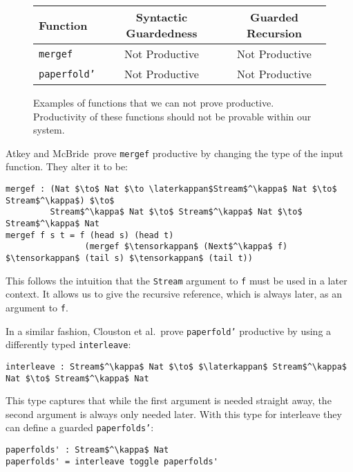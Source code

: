 \begin{figure}[h]
\begin{center}
  \begin{tabular}{| l | c | c |} \hline
    Function & Syntactic Guardedness & Guarded Recursion \\ \hline
    \texttt{mergef} & Not Productive & Not Productive \\ \hline
    \texttt{paperfold'} & Not Productive & Not Productive \\ \hline
  \end{tabular}
\end{center}
  \caption{Examples of functions that we can not prove productive. Productivity
    of these functions should not be provable within our system.}
  \label{fig:productivity_table_3}
\end{figure}

Atkey and McBride\,\citep{Atkey:2013} prove \texttt{mergef} productive by
changing the type of the input function. They alter it to be:

\begin{lstlisting}[mathescape, title=\idrisBlock]
mergef : (Nat $\to$ Nat $\to \laterkappan$Stream$^\kappa$ Nat $\to$ Stream$^\kappa$) $\to$
         Stream$^\kappa$ Nat $\to$ Stream$^\kappa$ Nat $\to$ Stream$^\kappa$ Nat
mergef f s t = f (head s) (head t) 
                (mergef $\tensorkappan$ (Next$^\kappa$ f) $\tensorkappan$ (tail s) $\tensorkappan$ (tail t))
\end{lstlisting}

This follows the intuition that the \texttt{Stream} argument to \texttt{f} must be used in a
later context. It allows us to give the recursive reference, which is always
later, as an argument to \texttt{f}.

In a similar fashion, Clouston et al.\,\citep{BirkedalL:guarded-lambda-conf}
prove \texttt{paperfold'} productive by using a differently typed \texttt{interleave}:

\begin{lstlisting}[mathescape, title=\idrisBlock]
interleave : Stream$^\kappa$ Nat $\to$ $\laterkappan$ Stream$^\kappa$ Nat $\to$ Stream$^\kappa$ Nat
\end{lstlisting}

This type captures that while the first argument is needed straight away, the
second argument is always only needed later. With this type for interleave they
can define a guarded \texttt{paperfolds'}:

\begin{lstlisting}[mathescape, title=\idrisBlock]
paperfolds' : Stream$^\kappa$ Nat
paperfolds' = interleave toggle paperfolds'
\end{lstlisting}


